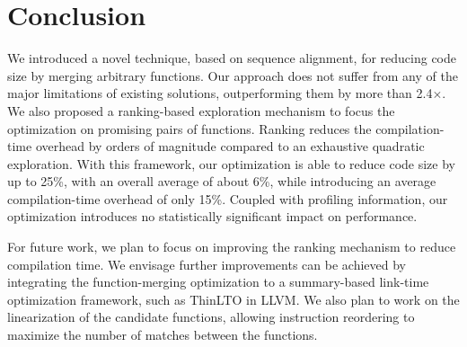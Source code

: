 \section{Conclusion}

We introduced a novel technique, based on sequence alignment, for reducing
code size by merging arbitrary functions. Our approach does not suffer from
any of the major limitations of existing solutions, outperforming them by more
than 2.4$\times$. We also proposed a ranking-based
exploration mechanism to focus the optimization on promising pairs of
functions. Ranking reduces the compilation-time overhead by orders of magnitude
compared to an exhaustive quadratic exploration. With this framework, our
optimization is able to reduce code size by up to 25\%, with an overall average
of about 6\%, while introducing an average compilation-time overhead of only 15\%.
Coupled with profiling information, our optimization introduces no statistically
significant impact on performance.

For future work, we plan to focus on improving the ranking mechanism to reduce compilation time. We envisage further improvements can be
achieved by integrating the function-merging optimization to a summary-based  link-time optimization framework, such as ThinLTO in LLVM. We
also plan to work on the linearization of the candidate functions, allowing instruction reordering to maximize the number of matches
between the functions.
